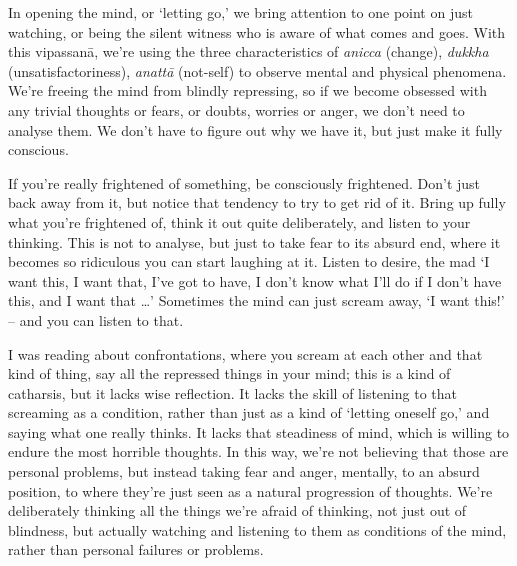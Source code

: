
In opening the mind, or `letting go,' we bring attention to one point on just watching, or being the silent witness who is aware of what comes and goes. With this vipassanā, we're using the three characteristics of \textit{anicca} (change), \textit{dukkha} (unsatisfactoriness), \textit{anattā} (not-self) to observe mental and physical phenomena. We're freeing the mind from blindly repressing, so if we become obsessed with any trivial thoughts or fears, or doubts, worries or anger, we don't need to analyse them. We don't have to figure out why we have it, but just make it fully conscious.

If you're really frightened of something, be consciously frightened. Don't just back away from it, but notice that tendency to try to get rid of it. Bring up fully what you're frightened of, think it out quite deliberately, and listen to your thinking. This is not to analyse, but just to take fear to its absurd end, where it becomes so ridiculous you can start laughing at it. Listen to desire, the mad `I want this, I want that, I've got to have, I don't know what I'll do if I don't have this, and I want that \ldots{}' Sometimes the mind can just scream away, `I want this!' -- and you can listen to that.

I was reading about confrontations, where you scream at each other and that kind of thing, say all the repressed things in your mind; this is a kind of catharsis, but it lacks wise reflection. It lacks the skill of listening to that screaming as a condition, rather than just as a kind of `letting oneself go,' and saying what one really thinks. It lacks that steadiness of mind, which is willing to endure the most horrible thoughts. In this way, we're not believing that those are personal problems, but instead taking fear and anger, mentally, to an absurd position, to where they're just seen as a natural progression of thoughts. We're deliberately thinking all the things we're afraid of thinking, not just out of blindness, but actually watching and listening to them as conditions of the mind, rather than personal failures or problems.


